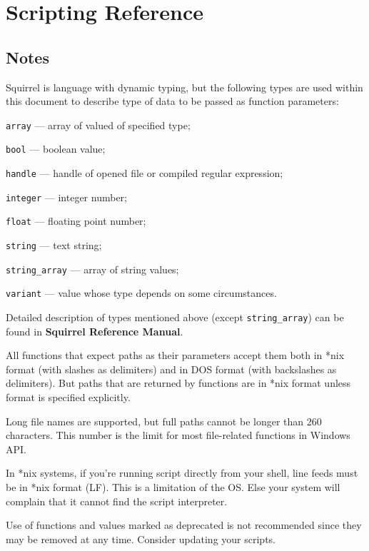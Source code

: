 \documentclass[a4paper, 10pt, titlepage]{article}
\begin{document}
\section{Scripting Reference}

\subsection{Notes}

Squirrel is language with dynamic typing, but the following types are used within this document to describe type of data to be passed as function parameters:
\begin{itemize*}
\item \texttt{array} --- array of valued of specified type;
\item \texttt{bool} --- boolean value;
\item \texttt{handle} --- handle of opened file or compiled regular expression;
\item \texttt{integer} --- integer number;
\item \texttt{float} --- floating point number;
\item \texttt{string} --- text string;
\item \texttt{string\_array} --- array of string values;
\item \texttt{variant} --- value whose type depends on some circumstances.
\end{itemize*}

Detailed description of types mentioned above (except \texttt{string\_array}) can be found in \textbf{Squirrel Reference Manual}.

All functions that expect paths as their parameters accept them both in *nix format (with slashes as delimiters) and in DOS format (with backslashes as delimiters). But paths that are returned by functions are in *nix format unless format is specified explicitly.

Long file names are supported, but full paths cannot be longer than 260 characters. This number is the limit for most file-related functions in Windows API.

In *nix systems, if you're running script directly from your shell, line feeds must be in *nix format (LF). This is a limitation of the OS. Else your system will complain that it cannot find the script interpreter.

Use of functions and values marked as deprecated is not recommended since they may be removed at any time. Consider updating your scripts.
\end{document}

